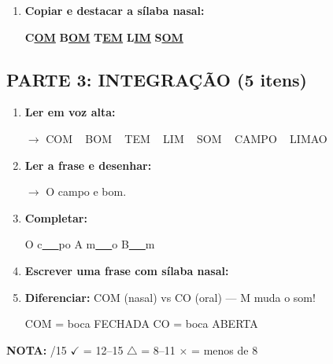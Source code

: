 \begin{exercicio}
\begin{enumerate}[resume]
  \item \textbf{Copiar e destacar a sílaba nasal:}
  \begin{center}
  \textbf{C}\underline{\textbf{OM}} \quad \textbf{B}\underline{\textbf{OM}} \quad \textbf{T}\underline{\textbf{EM}} \quad \textbf{L}\underline{\textbf{IM}} \quad \textbf{S}\underline{\textbf{OM}}
  \end{center}
\end{enumerate}

\subsection*{PARTE 3: INTEGRAÇÃO (5 itens)}

\begin{enumerate}[resume]
  \item \textbf{Ler em voz alta:}
  \begin{center}
  $\rightarrow$ COM  ~  BOM  ~  TEM  ~  LIM  ~  SOM  ~  CAMPO  ~  LIMAO
  \end{center}

  \item \textbf{Ler a frase e desenhar:}
  \begin{center}
  $\rightarrow$ O campo e bom.
  \end{center}
  \begin{center}
  \end{center}

  \item \textbf{Completar:}
  \begin{center}
  O c\underline{~~~}po \quad A m\underline{~~~}o \quad B\underline{~~~}m
  \end{center}

  \item \textbf{Escrever uma frase com sílaba nasal:}
  \begin{center}
  \underline{\hspace{12cm}}
  \end{center}

  \item \textbf{Diferenciar:} COM (nasal) vs CO (oral) --- M muda o som!
  \begin{center}
  COM = boca FECHADA \quad CO = boca ABERTA
  \end{center}
\end{enumerate}

\noindent\textbf{NOTA:} \underline{\hspace{1cm}}/15 \quad $\checkmark$ = 12--15 \quad $\triangle$ = 8--11 \quad $\times$ = menos de 8
\end{exercicio}

